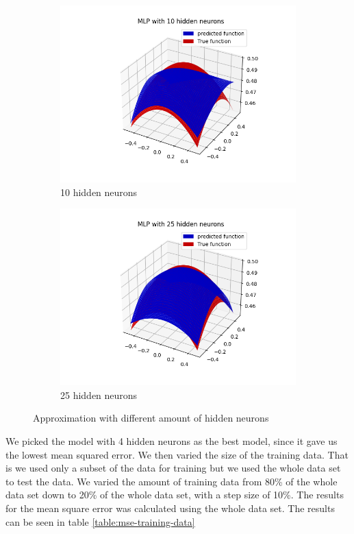 \documentclass[a4paper]{article}
\begin{document}
\begin{figure}[ht]
\begin{subfigure}{0.4\textwidth}
        \includegraphics[width=\textwidth]{Labs/Lab 1/Lab 1b/Figure/plots-10-hidden-neurons.png}
        \caption{10 hidden neurons}
    \end{subfigure}
    \hfill
    \begin{subfigure}{0.4\textwidth}
        \centering
        \includegraphics[width=\textwidth]{Labs/Lab 1/Lab 1b/Figure/plots-25-hidden-neurons.png}
        \caption{25 hidden neurons}
    \end{subfigure}
    \caption{Approximation with different amount of hidden neurons}
    \label{fig:different-hidden-neurons}
\end{figure}

We picked the model with 4 hidden neurons as the best model, since it gave us the lowest mean squared error. We then varied the size of the training data. That is we used only a subset of the data for training but we used the whole data set to test the data. We varied the amount of training data from 80\% of the whole data set down to 20\% of the whole data set, with a step size of  10\%. The results for the mean square error was calculated using the whole data set. The results can be seen in table \ref{table:mse-training-data}
\end{document}
